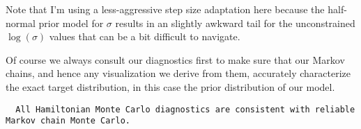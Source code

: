 \documentclass[
  letterpaper,
  DIV=11,
  numbers=noendperiod]{scrartcl}
\newenvironment{Shaded}{\begin{snugshade}}{\end{snugshade}}
\newcommand{\AttributeTok}[1]{\textcolor[rgb]{0.40,0.45,0.13}{#1}}
\newcommand{\DecValTok}[1]{\textcolor[rgb]{0.68,0.00,0.00}{#1}}
\newcommand{\FloatTok}[1]{\textcolor[rgb]{0.68,0.00,0.00}{#1}}
\newcommand{\FunctionTok}[1]{\textcolor[rgb]{0.28,0.35,0.67}{#1}}
\newcommand{\NormalTok}[1]{\textcolor[rgb]{0.00,0.23,0.31}{#1}}
\newcommand{\OtherTok}[1]{\textcolor[rgb]{0.00,0.23,0.31}{#1}}
\newcommand{\SpecialCharTok}[1]{\textcolor[rgb]{0.37,0.37,0.37}{#1}}
\newcommand{\StringTok}[1]{\textcolor[rgb]{0.13,0.47,0.30}{#1}}
\begin{document}
Note that I'm using a less-aggressive step size adaptation here because
the half-normal prior model for \(\sigma\) results in an slightly
awkward tail for the unconstrained \(\log(\sigma)\) values that can be a
bit difficult to navigate.

\begin{Shaded}
\end{Shaded}

Of course we always consult our diagnostics first to make sure that our
Markov chains, and hence any visualization we derive from them,
accurately characterize the exact target distribution, in this case the
prior distribution of our model.

\begin{Shaded}
\end{Shaded}

\begin{verbatim}
  All Hamiltonian Monte Carlo diagnostics are consistent with reliable
Markov chain Monte Carlo.
\end{verbatim}
\end{document}
